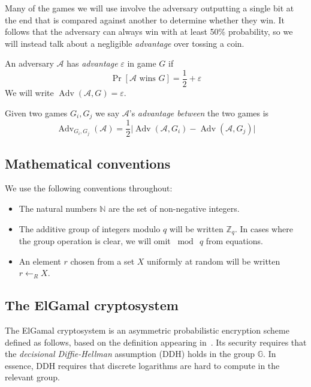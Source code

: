 \documentclass[12pt,a4paper]{article}
\DeclareMathOperator{\Adv}{\text{Adv}}
\theoremstyle{definition}
\begin{document}
Many of the games we will use involve the adversary outputting a single bit at the end that is compared against another to determine whether they win. It follows that the adversary can always win with at least 50\% probability, so we will instead talk about a negligible \textit{advantage} over tossing a coin. 
\begin{definition}[Advantage]
    An adversary $\mathcal{A}$ has \textit{advantage} $\varepsilon$ in game $G$ if
    $$\Pr\left[\mathcal{A}\text{ wins }G\right]=\frac{1}{2} + \varepsilon$$
    We will write $\Adv(\mathcal{A}, G)=\varepsilon$.

    Given two games $G_i, G_j$ we say $\mathcal{A}$'s \textit{advantage between} the two games is
    $$\Adv_{G_i, G_j}(\mathcal{A}) = \frac{1}{2}
    \Big|
        \Adv(\mathcal{A}, G_i)
         -
        \Adv(\mathcal{A}, G_j)
    \Big|$$
\end{definition}

\subsection{Mathematical conventions}
We use the following conventions throughout:
\begin{itemize}
    \item The natural numbers $\mathbb{N}$ are the set of non-negative integers.
    \item The additive group of integers modulo $q$ will be written $\mathbb{Z}_q$. In cases where the group operation is clear, we will omit $\bmod\ q$ from equations.
    \item An element $r$ chosen from a set $X$ uniformly at random will be written $r\gets_R X$.
\end{itemize}
\subsection{The ElGamal cryptosystem}\label{sec-elgamal}
The ElGamal cryptosystem is an asymmetric probabilistic encryption scheme defined as follows, based on the definition appearing in~\cite{katz2014introduction}. Its security requires that the \textit{decisional Diffie-Hellman} assumption (DDH) holds in the group $\mathbb{G}$. In essence, DDH requires that discrete logarithms are hard to compute in the relevant group.
\end{document}
